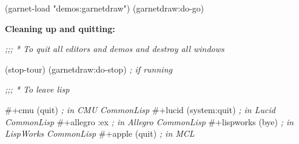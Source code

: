 \begin{programexample}

(garnet-load "demos:garnetdraw")
(garnetdraw:do-go)

\end{programexample}

{\bf Cleaning up and quitting:}
\begin{programexample}
{\it ;;; * To quit all editors and demos and destroy all windows}

(stop-tour)
(garnetdraw:do-stop)   {\it ; if running}

{\it ;;; * To leave lisp}

\#+cmu   (quit)         {\it ; in CMU CommonLisp}
\#+lucid (system:quit)  {\it ; in Lucid CommonLisp}
\#+allegro :ex          {\it ; in Allegro CommonLisp}
\#+lispworks (bye)      {\it ; in LispWorks CommonLisp}
\#+apple (quit)         {\it ; in MCL}

\end{programexample}


% 
% 
% 
% 
% 
% 
% 
% 
% 
% 
% 
% 
